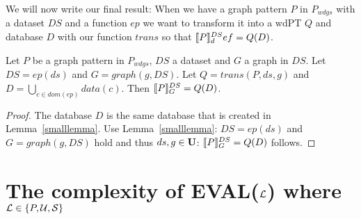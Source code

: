We will now write our final result: When we have a graph pattern $P$ in
$P_{wdgs}$ with a dataset $DS$ and a function $ep$ we want to transform it into a
wdPT $Q$ and database $D$ with our function $trans$ so that
$\llbracket P \rrbracket^{DS}_def = Q(D)$.
\begin{theorem}\label{biglemma}
    Let $P$ be a graph pattern in $P_{wdgs}$, $DS$ a dataset and $G$ a graph in $DS$.
    Let $DS = ep(ds)$  and $G = graph(g,DS)$. Let $Q = trans(P,ds,g)$ 
    and $D = \bigcup\limits_{c \in dom(ep)} data(c)$. Then $\llbracket P \rrbracket^{DS}_G = Q(D)$.
\end{theorem}
\begin{proof}
	The database $D$ is the same database that is created in
	Lemma~\ref{smalllemma}.
	Use Lemma~\ref{smalllemma}: 
	$DS = ep(ds)$  and $G = graph(g,DS)$ hold and thus $ds,g \in \mathbf{U}$:
	$\llbracket P \rrbracket^{DS}_G = Q(D)$ follows.
\end{proof}


\section{The complexity of EVAL($\mathcal{L}$) where $\mathcal{L} \in \{P,\mathcal{U},\mathcal{S}\}$ }

